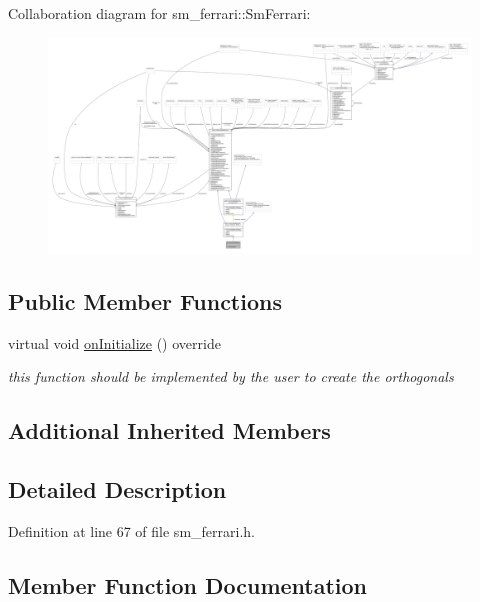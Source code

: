 Collaboration diagram for sm\+\_\+ferrari\+:\+:Sm\+Ferrari\+:
\nopagebreak
\begin{figure}[H]
\begin{center}
\leavevmode
\includegraphics[width=350pt]{structsm__ferrari_1_1SmFerrari__coll__graph}
\end{center}
\end{figure}
\subsection*{Public Member Functions}
\begin{DoxyCompactItemize}
\item 
virtual void \hyperlink{structsm__ferrari_1_1SmFerrari_a024d7b61edb9121eb68bfbcc20618636}{on\+Initialize} () override
\begin{DoxyCompactList}\small\item\em this function should be implemented by the user to create the orthogonals \end{DoxyCompactList}\end{DoxyCompactItemize}
\subsection*{Additional Inherited Members}


\subsection{Detailed Description}


Definition at line 67 of file sm\+\_\+ferrari.\+h.



\subsection{Member Function Documentation}
\mbox{\label{structsm__ferrari_1_1SmFerrari_a024d7b61edb9121eb68bfbcc20618636}} 
